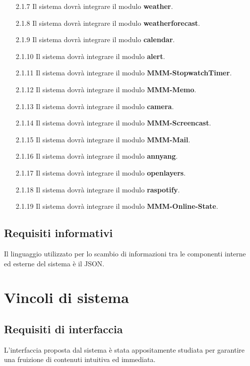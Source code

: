 \documentclass[a4paper,11pt]{article}       %
\begin{document}
\begin{itemize}
            \item[2.1.7] Il sistema dovrà integrare il modulo \textbf{weather}.
            \item[2.1.8] Il sistema dovrà integrare il modulo \textbf{weatherforecast}.
            \item[2.1.9] Il sistema dovrà integrare il modulo \textbf{calendar}.
            \item[2.1.10] Il sistema dovrà integrare il modulo \textbf{alert}.
            \item[2.1.11] Il sistema dovrà integrare il modulo \textbf{MMM-StopwatchTimer}.
            \item[2.1.12] Il sistema dovrà integrare il modulo \textbf{MMM-Memo}.
            \item[2.1.13] Il sistema dovrà integrare il modulo \textbf{camera}.
            \item[2.1.14] Il sistema dovrà integrare il modulo \textbf{MMM-Screencast}.
            \item[2.1.15] Il sistema dovrà integrare il modulo \textbf{MMM-Mail}.
            \item[2.1.16] Il sistema dovrà integrare il modulo \textbf{annyang}.
            \item[2.1.17] Il sistema dovrà integrare il modulo \textbf{openlayers}.
            \item[2.1.18] Il sistema dovrà integrare il modulo \textbf{raspotify}.
            \item[2.1.19] Il sistema dovrà integrare il modulo \textbf{MMM-Online-State}.
        \end{itemize}
        
    \subsection{Requisiti informativi}
        Il linguaggio utilizzato per lo scambio di informazioni tra le componenti interne ed esterne del sistema è il JSON.

\newpage

\section{Vincoli di sistema}
    
    \subsection{Requisiti di interfaccia}
        L'interfaccia proposta dal sistema è stata appositamente studiata per garantire una fruizione di contenuti intuitiva ed immediata.
        
\end{document}
